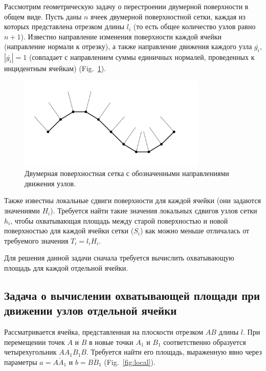 \documentclass[
11pt,%
tightenlines,%
twoside,%
onecolumn,%
nofloats,%
nobibnotes,%
nofootinbib,%
superscriptaddress,%
noshowpacs,%
centertags]%
{revtex4}
\begin{document}
Рассмотрим геометрическую задачу о перестроении двумерной поверхности в общем виде.
Пусть даны $n$ ячеек двумерной поверхностной сетки, каждая из которых представлена отрезком длины $l_i$ (то есть общее количество узлов равно $n + 1$).
Известно направление изменения поверхности каждой ячейки (направление нормали к отрезку), а также направление движения каждого узла $\overline{g_i}$, $|\overline{g_i}| = 1$ (совпадает с направлением суммы единичных нормалей, проведенных к инцидентным ячейкам) (Fig.~\ref{fig:grid_normals}).

\begin{figure}[h]
\setcaptionmargin{5mm}
\onelinecaptionstrue
\includegraphics[width=0.8\textwidth]{pics/grid_normals.pdf}
\caption{Двумерная поверхностная сетка с обозначенными направлениями движения узлов.}
\label{fig:grid_normals}
\end{figure}

Также известны локальные сдвиги поверхности для каждой ячейки (они задаются значениями $H_i$).
Требуется найти такие значения локальных сдвигов узлов сетки $h_i$, чтобы охватывающая площадь между старой поверхностью и новой поверхностью для каждой ячейки сетки ($S_i$) как можно меньше отличалась от требуемого значения $T_i = l_iH_i$.

Для решения данной задачи сначала требуется вычислить охватывающую площадь для каждой отдельной ячейки.

\subsection{Задача о вычислении охватывающей площади при движении узлов отдельной ячейки}

Рассматривается ячейка, представленная на плоскости отрезком $AB$ длины $l$.
При перемещении точек $A$ и $B$ в новые точки $A_1$ и $B_1$ соответственно образуется четырехугольник $AA_1B_1B$.
Требуется найти его площадь, выраженную явно через параметры $a = \overline{AA_1}$ и $b = \overline{BB_1}$ (Fig.~\ref{fig:local}).
\end{document}
